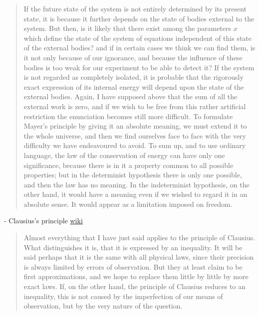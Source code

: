  \begin{quote}
     If the future state of the system is not entirely determined by its present state, it is because it further depends on the state of bodies external to the system.  But then, is it likely that there exist among the parameters $x$ which define the state of the system of equations independent of this state of the external bodies? and if in certain cases we think we can find them, is it not only because of our ignorance, and because the influence of these bodies is too weak for our experiment to be able to detect it?  If the system is not regarded as completely isolated, it is probable that the rigorously exact expression of its internal energy will depend upon the state of the external bodies.  Again, I have supposed above that the sum of all the external work is zero, and if we wish to be free from this rather artificial restriction the enunciation becomes still more difficult.  To formulate Mayer's principle by giving it an absolute meaning, we must extend it to the whole universe, and then we find ourselves face to face with the very difficulty we have endeavoured to avoid.  To sum up, and to use ordinary language, the law of the conservation of energy can have only one significance, because there is in it a property common to all possible properties; but in the determinist hypothesis there is only one possible, and then the law has no meaning.  In the indeterminist hypothesis, on the other hand, it would have a meaning even if we wished to regard it in an absolute sense.  It would appear as a limitation imposed on freedom.  \cite[p. 133-134]{Poincare1952}
 \end{quote}
 
 - Clausius's principle \href{https://en.wikipedia.org/wiki/Clausius_theorem}{wiki}
 

 
 \begin{quote}
     Almost everything that I have just said applies to the principle of Clausius.  What distinguishes it is, that it is expressed by an inequality.  It will be said perhaps that it is the same with all physical laws, since their precision is always limited by errors of observation.  But they at least claim to be first approximations, and we hope to replace them little by little by more exact laws.  If, on the other hand, the principle of Clausius reduces to an inequality, this is not caused by the imperfection of our means of observation, but by the very nature of the question.  \citep[p. 135]{Poincare1952}
 \end{quote}
 
